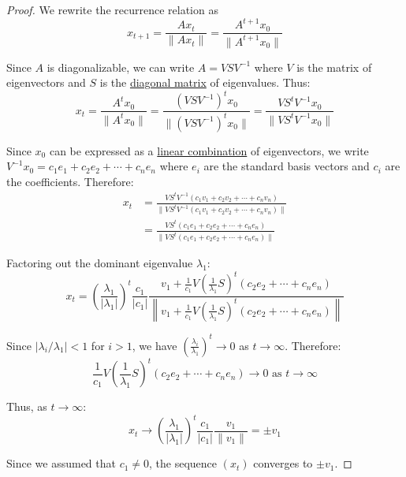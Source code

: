   \begin{proof}
    We rewrite the recurrence relation as 
    \begin{equation}
    x_{t+1} = \frac{Ax_t}{\|Ax_t\|} = \frac{A^{t+1}x_0}{\|A^{t+1}x_0\|}
    \end{equation}

    Since $A$ is diagonalizable, we can write $A = VSV^{-1}$ where $V$ is the matrix of eigenvectors and $S$ is the \hyperref[lin-def:diagonal-matrix]{diagonal matrix} of eigenvalues. Thus:
    \begin{equation}
    x_t = \frac{A^t x_0}{\|A^t x_0\|} = \frac{(VSV^{-1})^t x_0}{\|(VSV^{-1})^t x_0\|} = \frac{VS^t V^{-1} x_0}{\|VS^t V^{-1} x_0\|}
    \end{equation}

    Since $x_0$ can be expressed as a \hyperref[lin-def:linear-combination]{linear combination} of eigenvectors, we write $V^{-1}x_0 = c_1 e_1 + c_2 e_2 + \cdots + c_n e_n$ where $e_i$ are the standard basis vectors and $c_i$ are the coefficients. Therefore:
    \begin{align}
      x_t & = \frac{VS^t V^{-1}(c_1 v_1 + c_2 v_2 + \cdots + c_n v_n)}{\|VS^t V^{-1}(c_1 v_1 + c_2 v_2 + \cdots + c_n v_n)\|} \\ 
          & = \frac{VS^t(c_1 e_1 + c_2 e_2 + \cdots + c_n e_n)}{\|VS^t(c_1 e_1 + c_2 e_2 + \cdots + c_n e_n)\|}
    \end{align}

    Factoring out the dominant eigenvalue $\lambda_1$:
    \begin{equation}
      x_t = \left(\frac{\lambda_1}{|\lambda_1|}\right)^t \frac{c_1}{|c_1|} \frac{v_1 + \frac{1}{c_1}V\left(\frac{1}{\lambda_1}S\right)^t(c_2 e_2 + \cdots + c_n e_n)}{\left\|v_1 + \frac{1}{c_1}V\left(\frac{1}{\lambda_1}S\right)^t(c_2 e_2 + \cdots + c_n e_n)\right\|}
    \end{equation}

    Since $|\lambda_i/\lambda_1| < 1$ for $i > 1$, we have $\left(\frac{\lambda_i}{\lambda_1}\right)^t \to 0$ as $t \to \infty$. Therefore:
    \begin{equation}
    \frac{1}{c_1}V\left(\frac{1}{\lambda_1}S\right)^t(c_2 e_2 + \cdots + c_n e_n) \to 0 \text{ as } t \to \infty
    \end{equation}

    Thus, as $t \to \infty$:
    \begin{equation}
    x_t \to \left(\frac{\lambda_1}{|\lambda_1|}\right)^t \frac{c_1}{|c_1|} \frac{v_1}{\|v_1\|} = \pm v_1
    \end{equation}

    Since we assumed that $c_1 \neq 0$, the sequence $(x_t)$ converges to $\pm v_1$. 
  \end{proof}

